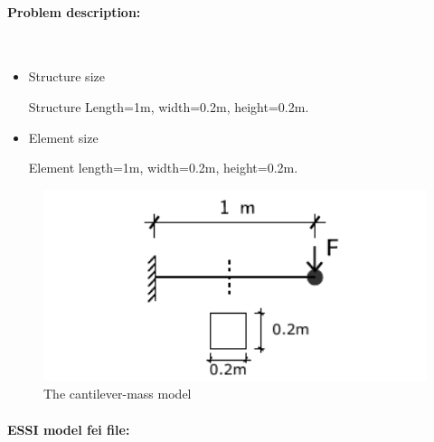 \paragraph{Problem description:} ~

\begin{itemize}
  \item Structure size

    Structure Length=1m, width=0.2m, height=0.2m.

  \item Element size

    Element length=1m, width=0.2m, height=0.2m.
\end{itemize}

\begin{figure}[!htb]
  \centering
  \includegraphics[width=12cm]{./Figure-files/_Chapter_Appendix_Illustrative_Examples/cantilever-mass.pdf}
  \caption{The cantilever-mass model}
  \label{fig_cantilever_mass_1}
\end{figure}


\paragraph{ESSI model fei file: } ~

